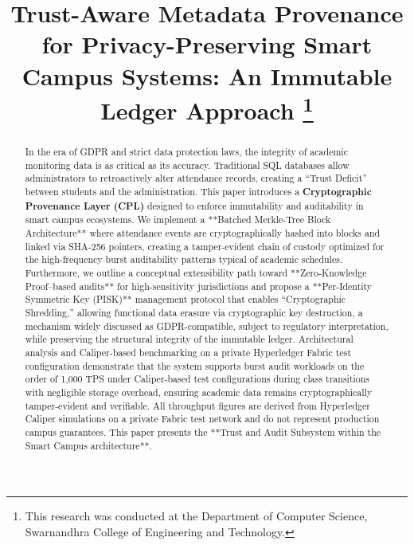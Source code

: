 \documentclass[conference]{IEEEtran}
\begin{document}
\title{Trust-Aware Metadata Provenance for Privacy-Preserving Smart Campus Systems: An Immutable Ledger Approach
\thanks{This research was conducted at the Department of Computer Science, Swarnandhra College of Engineering and Technology.}
}

\author{
}

\maketitle

\begin{abstract}
In the era of GDPR and strict data protection laws, the integrity of academic monitoring data is as critical as its accuracy. Traditional SQL databases allow administrators to retroactively alter attendance records, creating a ``Trust Deficit'' between students and the administration. This paper introduces a \textbf{Cryptographic Provenance Layer (CPL)} designed to enforce immutability and auditability in smart campus ecosystems. We implement a **Batched Merkle-Tree Block Architecture** where attendance events are cryptographically hashed into blocks and linked via SHA-256 pointers, creating a tamper-evident chain of custody optimized for the high-frequency burst auditability patterns typical of academic schedules. Furthermore, we outline a conceptual extensibility path toward **Zero-Knowledge Proof–based audits** for high-sensitivity jurisdictions and propose a **Per-Identity Symmetric Key (PISK)** management protocol that enables ``Cryptographic Shredding,'' allowing functional data erasure via cryptographic key destruction, a mechanism widely discussed as GDPR-compatible, subject to regulatory interpretation, while preserving the structural integrity of the immutable ledger. Architectural analysis and Caliper-based benchmarking on a private Hyperledger Fabric test configuration demonstrate that the system supports burst audit workloads on the order of 1,000 TPS under Caliper-based test configurations during class transitions with negligible storage overhead, ensuring academic data remains cryptographically tamper-evident and verifiable. All throughput figures are derived from Hyperledger Caliper simulations on a private Fabric test network and do not represent production campus guarantees. This paper presents the **Trust and Audit Subsystem within the Smart Campus architecture**.
\end{abstract}
\end{document}

